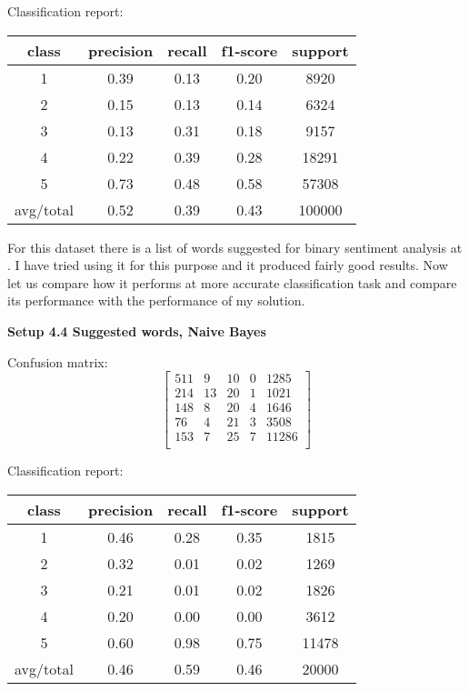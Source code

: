 \documentclass[12pt]{report}
\begin{document}
Classification report:

\begin{center}
	\begin{tabular}{c | c | c | c | c }
		\hline
		class & precision & recall & f1-score & support \\ \hline
		1 & 0.39 & 0.13 & 0.20 & 8920 \\ \hline
		2 & 0.15 & 0.13 & 0.14 & 6324 \\ \hline
		3 & 0.13 & 0.31 & 0.18 & 9157 \\ \hline
		4 & 0.22 & 0.39 & 0.28 & 18291 \\ \hline
		5 & 0.73 & 0.48 & 0.58 & 57308 \\ \hline
		avg/total & 0.52 & 0.39 & 0.43 & 100000 \\ \hline
	\end{tabular}
\end{center}


For this dataset there is a list of words suggested for binary sentiment analysis at \cite{important-words}. I have tried using it for this purpose and it produced fairly good results. Now let us compare how it performs at more accurate classification task and compare its performance with the performance of my solution.

\bigbreak

\textbf{Setup 4.4 Suggested words, Naive Bayes}

Confusion matrix:
\[
\begin{bmatrix}
511 & 9 & 10 & 0 & 1285 \\
214 & 13 & 20 & 1 & 1021 \\
148 & 8 & 20 & 4 & 1646 \\
76 & 4 & 21 & 3 & 3508 \\
153 & 7 & 25 & 7 & 11286 \\
\end{bmatrix}
\]

Classification report:

\begin{center}
	\begin{tabular}{c | c | c | c | c }
		\hline
		class & precision & recall & f1-score & support \\ \hline
		1 & 0.46 & 0.28 & 0.35 & 1815 \\ \hline
		2 & 0.32 & 0.01 & 0.02 & 1269 \\ \hline
		3 & 0.21 & 0.01 & 0.02 & 1826 \\ \hline
		4 & 0.20 & 0.00 & 0.00 & 3612 \\ \hline
		5 & 0.60 & 0.98 & 0.75 & 11478 \\ \hline
		avg/total & 0.46 & 0.59 & 0.46 & 20000 \\ \hline
	\end{tabular}
\end{center}
\end{document}

